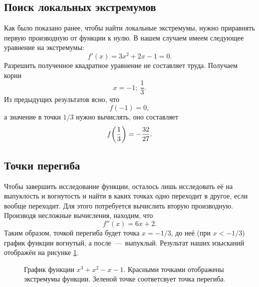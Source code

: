 \documentclass[12pt]{article}
\begin{document}
\subsection{Поиск локальных экстремумов} %
Как было показано ранее, чтобы найти локальные экстремумы, нужно приравнять первую производную от функции к нулю. В нашем случаем имеем следующее уравнение на экстремумы:
\begin{equation}
	f'(x) = 3x^2 +2x - 1 = 0.
\end{equation}
Разрешить полученное квадратное уравнение не составляет труда. Получаем корни 
\begin{equation}
	x = -1;\ \dfrac{1}{3}. 
\end{equation}
Из предыдущих результатов ясно, что 
\begin{equation}
	f(-1) = 0,
\end{equation}
а значение в точки $1/3$ нужно вычислять, оно составляет
\begin{equation}
	f\qty(\dfrac{1}{3}) = -\dfrac{32}{27}.
\end{equation}

\subsection{Точки перегиба} %
\label{sec:53}
Чтобы завершить исследование функции, осталось лишь исследовать её на выпуклость и вогнутость и найти в каких точках одно переходит в другое, если вообще переходит. Для этого потребуется вычислить вторую производную. Производя несложные вычисления, находим, что 
\begin{equation}
	f''(x) = 6x + 2.
\end{equation}
Таким образом, точкой перегиба будет точка $x = -1/3$, до неё (при $x< -1/3$) график функции вогнутый, а после~\----~выпуклый. Результат наших изысканий отображён на рисунке \ref{fig:73}.

\begin{figure}[htbp]
	\centering
	\caption{График функции $x^3 + x^2 - x -1$. Красными точками отображены экстремумы функции. Зеленой точке соответсвует точка перегиба.}
	\label{fig:73}
\end{figure}
\end{document}
